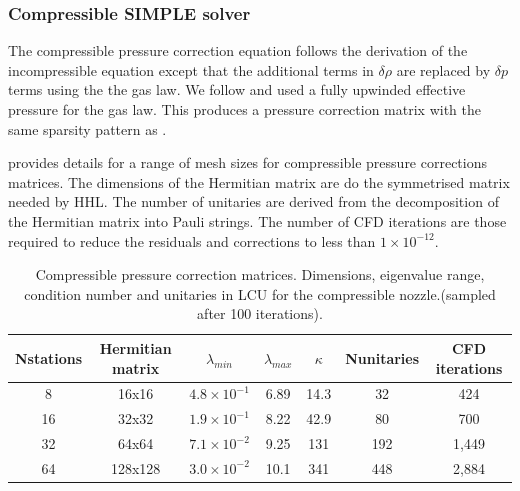 \subsubsection{Compressible SIMPLE solver}
\label{subsubsec-comp-simple}

The compressible pressure correction equation follows the derivation of the
incompressible equation except that the additional terms in $\delta \rho$ are 
replaced by $\delta p$ terms using the the gas law. 
We follow \cite{gupta1993development} and used a fully upwinded effective pressure
for the gas law.
This produces a pressure correction matrix with the same sparsity pattern as 
.


 provides details for a range of mesh sizes for 
compressible pressure corrections matrices. 
The dimensions of the Hermitian matrix are do the symmetrised
matrix needed by HHL. The number of unitaries are derived from the decomposition of
the Hermitian matrix into Pauli strings.
The number of CFD iterations are those required to reduce the residuals and 
corrections to less than $1 \times 10^{-12}$.

\begin{table}[h]
  \centering
  \begin{tabular}{c c c c c c c}
    \toprule
    Nstations & Hermitian matrix &  $\lambda_{min}$ & $\lambda_{max}$ & $\kappa$ & Nunitaries & CFD iterations \\
    \midrule
     8   &   16x16     & $4.8\times10^{-1}$ & 6.89    & 14.3     & 32  & 424   \\
     16  &   32x32     & $1.9\times10^{-1}$ & 8.22    & 42.9     & 80  & 700   \\
     32  &   64x64     & $7.1\times10^{-2}$ & 9.25    & 131      & 192 & 1,449 \\
     64  &  128x128    & $3.0\times10^{-2}$ & 10.1    & 341      & 448 & 2,884 \\
    \bottomrule
  \end{tabular}
  \caption{Compressible pressure correction matrices.
           Dimensions, eigenvalue range, condition number and unitaries in LCU
           for the compressible nozzle.(sampled after 100 iterations).}
  \label{tab-pc-comp}
\end{table}

